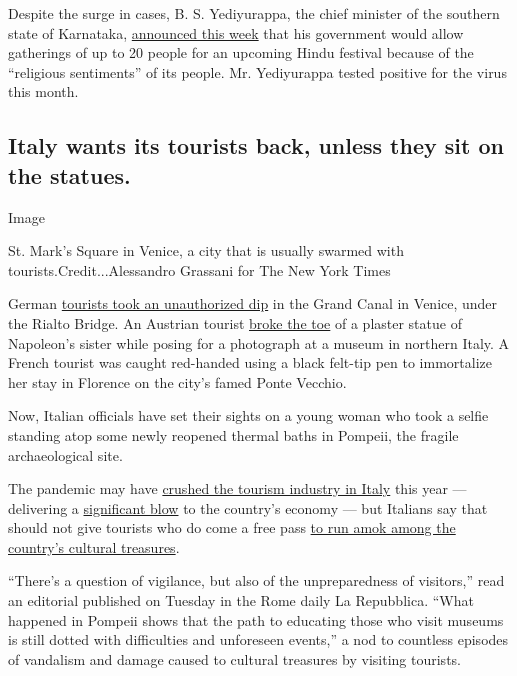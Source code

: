 Despite the surge in cases, B. S. Yediyurappa, the chief minister of the
southern state of Karnataka,
\href{https://twitter.com/CMofKarnataka/status/1295608792378273792}{announced
this week} that his government would allow gatherings of up to 20 people
for an upcoming Hindu festival because of the ``religious sentiments''
of its people. Mr. Yediyurappa tested positive for the virus this month.

\hypertarget{italy-wants-its-tourists-back-unless-they-sit-on-the-statues}{%
\subsection{Italy wants its tourists back, unless they sit on the
statues.}\label{italy-wants-its-tourists-back-unless-they-sit-on-the-statues}}

Image

St. Mark's Square in Venice, a city that is usually swarmed with
tourists.Credit...Alessandro Grassani for The New York Times

German \href{https://www.youtube.com/watch?v=dOfUmHXjXqg}{tourists took
an unauthorized dip} in the Grand Canal in Venice, under the Rialto
Bridge. An Austrian tourist
\href{https://www.nytimes3xbfgragh.onion/2020/08/06/arts/tourist-breaks-sculptures-toes.html?searchResultPosition=1}{broke
the toe} of a plaster statue of Napoleon's sister while posing for a
photograph at a museum in northern Italy. A French tourist was caught
red-handed using a black felt-tip pen to immortalize her stay in
Florence on the city's famed Ponte Vecchio.

Now, Italian officials have set their sights on a young woman who took a
selfie standing atop some newly reopened thermal baths in Pompeii, the
fragile archaeological site.

The pandemic may have
\href{https://www.confcommercio.it/-/niente-turisti-stranieri-crolla-lusso}{crushed
the tourism industry in Italy} this year --- delivering a
\href{https://ec.europa.eu/growth/tools-databases/vto/content/oecd-tourism-trends-and-policies-2018-italy}{significant
blow} to the country's economy --- but Italians say that should not give
tourists who do come a free pass
\href{https://www.nytimes3xbfgragh.onion/2020/08/19/world/europe/italy-vandalism-tourism.html}{to
run amok among the country's cultural treasures}.

``There's a question of vigilance, but also of the unpreparedness of
visitors,'' read an editorial published on Tuesday in the Rome daily La
Repubblica. ``What happened in Pompeii shows that the path to educating
those who visit museums is still dotted with difficulties and unforeseen
events,'' a nod to countless episodes of vandalism and damage caused to
cultural treasures by visiting tourists.

